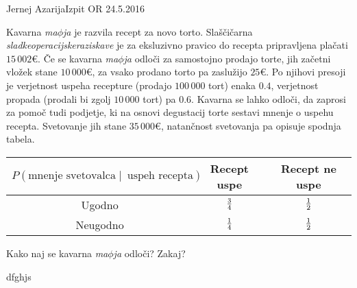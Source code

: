 \begin{naloga}{Jernej Azarija}{Izpit OR 24.5.2016}
\begin{vprasanje}
Kavarna {\em ma$\phi$ja} je razvila recept za novo torto.
Slaščičarna {\em sladkeoperacijskeraziskave}
je za eksluzivno pravico do recepta pripravljena plačati $15\,002 €$.
Če se kavarna {\em ma$\phi$ja} odloči za samostojno prodajo torte,
jih začetni vložek stane $10\,000 €$,
za vsako prodano torto pa zaslužijo $25 €$.
Po njihovi presoji
je verjetnost uspeha recepture (prodajo $100\,000$ tort) enaka $0.4$,
verjetnost propada (prodali bi zgolj $10\,000$ tort) pa $0.6$.
Kavarna se lahko odloči, da zaprosi za pomoč tudi pod\-jet\-je,
ki na osnovi degustacij torte sestavi mnenje o uspehu recepta.
Svetovanje jih stane $35\,000 €$,
natančnost svetovanja pa opisuje spodnja tabela.
\begin{center}
\begin{tabular}{c|cc}
$P(\text{mnenje svetovalca} \;|\;\ \text{uspeh recepta})$
& Recept uspe & Recept ne uspe \\ \hline
Ugodno   & ${3 \over 4}$ & ${1 \over 2}$ \\
Neugodno & ${1 \over 4}$ & ${1 \over 2}$
\end{tabular}
\end{center}
Kako naj se kavarna {\em ma$\phi$ja} odloči?
Zakaj?
\end{vprasanje}
\begin{odgovor}

dfghjs

\end{odgovor}
\end{naloga}

